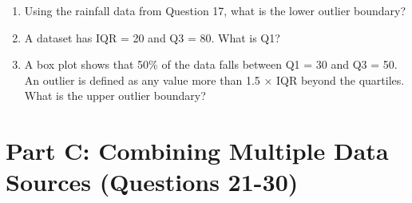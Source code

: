 \documentclass[12pt,a4paper]{article}
\begin{document}
\begin{enumerate}
\item Using the rainfall data from Question 17, what is the lower outlier boundary?

\item A dataset has IQR = 20 and Q3 = 80. What is Q1?

\item A box plot shows that 50\% of the data falls between Q1 = 30 and Q3 = 50. An outlier is defined as any value more than 1.5 × IQR beyond the quartiles. What is the upper outlier boundary?

\end{enumerate}

\section{Part C: Combining Multiple Data Sources (Questions 21-30)}
\end{document}
